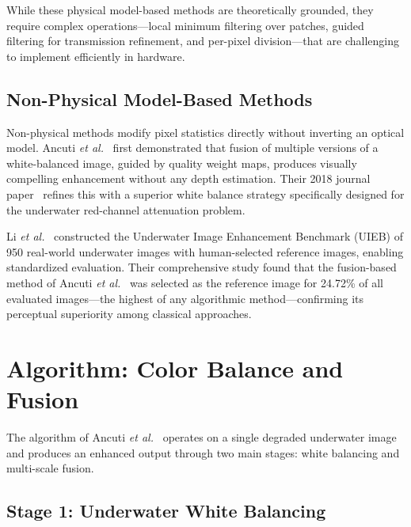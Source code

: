 \documentclass[10pt,twocolumn,letterpaper]{article}
\begin{document}
While these physical model-based methods are theoretically grounded,
they require complex operations---local minimum filtering over patches,
guided filtering for transmission refinement, and per-pixel division---that
are challenging to implement efficiently in hardware.

\subsection{Non-Physical Model-Based Methods}

Non-physical methods modify pixel statistics directly without inverting an
optical model. Ancuti \emph{et al.}~\cite{ancuti2012enhancing} first
demonstrated that fusion of multiple versions of a white-balanced image,
guided by quality weight maps, produces visually compelling enhancement
without any depth estimation. Their 2018 journal
paper~\cite{ancuti2018color} refines this with a superior white balance
strategy specifically designed for the underwater red-channel attenuation
problem.

Li \emph{et al.}~\cite{li2020underwater} constructed the Underwater Image
Enhancement Benchmark (UIEB) of 950 real-world underwater images with
human-selected reference images, enabling standardized evaluation. Their
comprehensive study found that the fusion-based method of Ancuti
\emph{et al.}~\cite{ancuti2018color} was selected as the reference image
for 24.72\% of all evaluated images---the highest of any algorithmic
method---confirming its perceptual superiority among classical approaches.

\section{Algorithm: Color Balance and Fusion}
\label{sec:algorithm}

The algorithm of Ancuti \emph{et al.}~\cite{ancuti2018color} operates on a
single degraded underwater image and produces an enhanced output through
two main stages: white balancing and multi-scale fusion.

\subsection{Stage 1: Underwater White Balancing}
\end{document}
